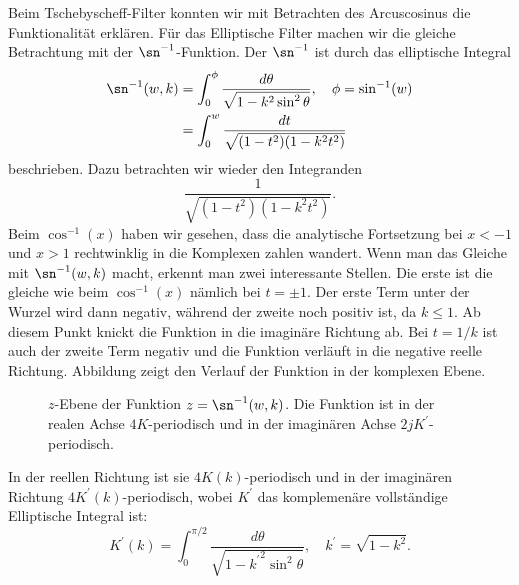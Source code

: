 Beim Tschebyscheff-Filter konnten wir mit Betrachten des Arcuscosinus die Funktionalität erklären.
Für das Elliptische Filter machen wir die gleiche Betrachtung mit der $\sn^{-1}$-Funktion.
Der $\sn^{-1}$ ist durch das elliptische Integral
\begin{align}
    \sn^{-1}(w, k)
        & =
    \int_{0}^{\phi}
    \frac{
        d\theta
    }{
        \sqrt{
            1-k^2 \sin^2 \theta
        }
    },
    \quad
    \phi = \sin^{-1}(w)
    \\
        & =
    \int_{0}^{w}
    \frac{
        dt
    }{
        \sqrt{
            (1-t^2)(1-k^2 t^2)
        }
    }
\end{align}
beschrieben.
Dazu betrachten wir wieder den Integranden
\begin{equation}
    \frac{
        1
    }{
        \sqrt{
            (1-t^2)(1-k^2 t^2)
        }
    }.
\end{equation}
Beim $\cos^{-1}(x)$ haben wir gesehen, dass die analytische Fortsetzung bei $x < -1$ und $x > 1$ rechtwinklig in die Komplexen zahlen wandert.
Wenn man das Gleiche mit $\sn^{-1}(w, k)$ macht, erkennt man zwei interessante Stellen.
Die erste ist die gleiche wie beim $\cos^{-1}(x)$ nämlich bei $t = \pm 1$.
Der erste Term unter der Wurzel wird dann negativ, während der zweite noch positiv ist, da $k \leq 1$.
Ab diesem Punkt knickt die Funktion in die imaginäre Richtung ab.
Bei $t = 1/k$ ist auch der zweite Term negativ und die Funktion verläuft in die negative reelle Richtung.
Abbildung \label{ellfilter:fig:sn} zeigt den Verlauf der Funktion in der komplexen Ebene.
\begin{figure}
    \centering
    
    \caption{
        $z$-Ebene der Funktion $z = \sn^{-1}(w, k)$.
        Die Funktion ist in der realen Achse $4K$-periodisch und in der imaginären Achse $2jK^\prime$-periodisch.
    }
    \label{ellfilter:fig:sn}
\end{figure}
In der reellen Richtung ist sie $4K(k)$-periodisch und in der imaginären Richtung $4K^\prime(k)$-periodisch, wobei $K^\prime$ das komplemenäre vollständige Elliptische Integral ist:
\begin{equation}
    K^\prime(k)
    =
    \int_{0}^{\pi / 2}
    \frac{
        d\theta
    }{
        \sqrt{
            1-{k^\prime}^2 \sin^2 \theta
        }
    },
    \quad
    k^\prime = \sqrt{1-k^2}.
\end{equation}
